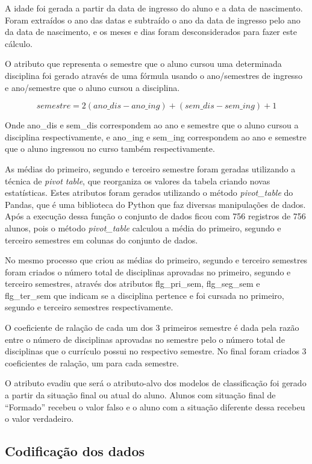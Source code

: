 \documentclass[diss,capa]{texufpel}
\begin{document}
A idade foi gerada a partir da data de ingresso do aluno e a data de nascimento.
Foram extraídos o ano das datas e subtraído o ano da data de ingresso pelo ano da data de nascimento, e os meses e dias foram desconsiderados para fazer este cálculo.

O atributo que representa o semestre que o aluno cursou uma determinada disciplina foi gerado através de uma fórmula usando o ano/semestres de ingresso e ano/semestre que o aluno cursou a disciplina.

\[semestre = 2(ano\_dis - ano\_ing) + (sem\_dis - sem\_ing) + 1\]

Onde ano\_dis e sem\_dis correspondem ao ano e semestre que o aluno cursou a disciplina respectivamente, e ano\_ing e sem\_ing correspondem ao ano e semestre que o aluno ingressou no curso também respectivamente.

As médias do primeiro, segundo e terceiro semestre foram geradas utilizando a técnica de \textit{pivot table}, que reorganiza os valores da tabela criando novas estatísticas.
Estes atributos foram gerados utilizando o método \textit{pivot\_table} do Pandas, que é uma biblioteca do Python que faz diversas manipulações de dados. Após a execução dessa função o conjunto de dados ficou com 756 registros de 756 alunos, pois o método \textit{pivot\_table} calculou a média do primeiro, segundo e terceiro semestres em colunas do conjunto de dados.

No mesmo processo que criou as médias do primeiro, segundo e terceiro semestres foram criados o número total de disciplinas aprovadas no primeiro, segundo e terceiro semestres, através dos atributos flg\_pri\_sem, flg\_seg\_sem e flg\_ter\_sem que indicam se a disciplina pertence e foi cursada no primeiro, segundo e terceiro semestres respectivamente.

O coeficiente de ralação de cada um dos 3 primeiros semestre é dada pela razão entre o número de disciplinas aprovadas no semestre pelo o número total de disciplinas que o currículo possui no respectivo semestre. No final foram criados 3 coeficientes de ralação, um para cada semestre.

O atributo evadiu que será o atributo-alvo dos modelos de classificação foi gerado a partir da situação final ou atual do aluno.
Alunos com situação final de ``Formado'' recebeu o valor falso e o aluno com a situação diferente dessa recebeu o valor verdadeiro.

\subsection{Codificação dos dados}
\end{document}
